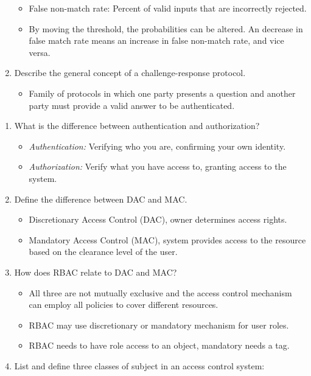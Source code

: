 \documentclass[12pt]{article}
\begin{document}
\begin{enumerate}[label=Q3.\arabic*]
\begin{itemize}
				\item False non-match rate: Percent of valid inputs that are incorrectly rejected.
				\item By moving the threshold, the probabilities can be altered. An decrease in false match rate means an increase in false non-match rate, and vice versa.
			\end{itemize}
		\item Describe the general concept of a challenge-response protocol.
			\begin{itemize}
				\item Family of protocols in which one party presents a question and another party must provide a valid answer to be authenticated.
			\end{itemize}
	\end{enumerate}
	\begin{enumerate}[lable=Q4.\arabic*]
		\item What is the difference between authentication and authorization?
			\begin{itemize}
				\item \textit{Authentication:} Verifying who you are, confirming your own identity.
				\item \textit{Authorization:} Verify what you have access to, granting access to the system.
			\end{itemize}
		\item Define the difference between DAC and MAC.
			\begin{itemize}
				\item Discretionary Access Control (DAC), owner determines access rights.
				\item Mandatory Access Control (MAC), system provides access to the resource based on the clearance level of the user.
			\end{itemize}
		\item How does RBAC relate to DAC and MAC?
			\begin{itemize}
				\item  All three are not mutually exclusive and the access control mechanism can employ all policies to cover different resources.
				\item RBAC may use discretionary or mandatory mechanism for user roles.
				\item RBAC needs to have role access to an object, mandatory needs a tag.
			\end{itemize}
		\item List and define three classes of subject in an access control system:

\end{enumerate}
\end{document}
